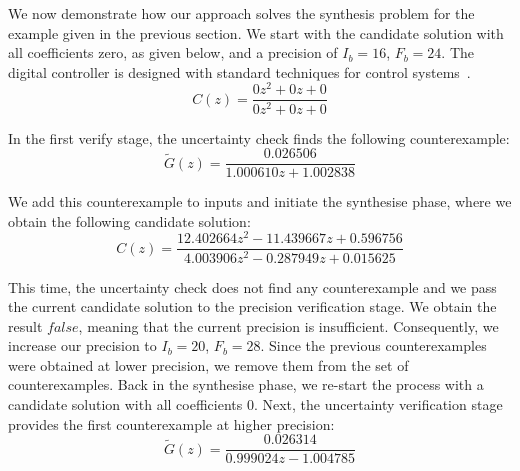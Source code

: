 \documentclass{sig-alternate-05-2015}
\newcommand{\red}[1]{{\color{red}#1}}
\begin{document}
We now demonstrate how our approach solves the synthesis problem for the
example given in the previous section.  We start with the candidate solution
with all coefficients zero, as given below, and a precision of $I_b=16$,
$F_b=24$.  The digital controller is designed with standard techniques for
control systems~\cite{Kuo:2002:ACS:579453, Ogata:1987:DCS:26170}.
%
%
$$ C(z)=\frac{0z^2{+}0z{+}0}{0z^2{+}0z{+}0} $$

In the first {\sc verify} stage, the {\sc uncertainty} 
check finds the following counterexample:
%
$$ \tilde G(z) = \frac{0.026506}{1.000610z+1.002838} $$


We add this counterexample to {\sc inputs} and initiate the {\sc synthesise}
phase, where we obtain the following candidate solution:
%
$$
C(z)=\frac{12.402664z^2{-}11.439667z{+}0.596756}{4.003906z^2{-}0.287949z{+}0.015625}
$$

This time, the {\sc uncertainty} check does not find any
counterexample and we pass the current candidate solution to the {\sc
precision} verification stage.
%
%
We obtain the result $\mathit{false}$, meaning that the current precision is
insufficient.  Consequently, we increase our precision to $I_b=20$, $F_b=28$.
%
Since the previous counterexamples were obtained at lower precision, we
remove them from the set of counterexamples.  Back in the {\sc synthesise}
phase, we re-start the process with a candidate solution with all
coefficients $0$.  Next, the {\sc uncertainty} verification stage provides
the first counterexample at higher precision:
%
$$ \tilde G(z) = \frac{0.026314}{0.999024z{-}1.004785} $$
\end{document}
